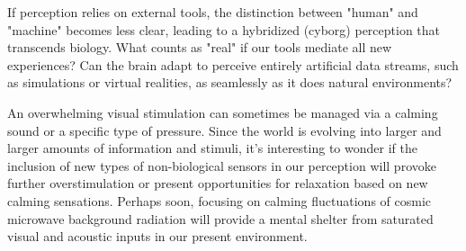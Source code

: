 If perception relies on external tools, the distinction between "human" and "machine" becomes less clear, leading to a hybridized (cyborg) perception that transcends biology. What counts as "real" if our tools mediate all new experiences? Can the brain adapt to perceive entirely artificial data streams, such as simulations or virtual realities, as seamlessly as it does natural environments?

An overwhelming visual stimulation can sometimes be managed via a calming sound or a specific type of pressure. Since the world is evolving into larger and larger amounts of information and stimuli, it's interesting to wonder if the inclusion of new types of non-biological sensors in our perception will provoke further overstimulation or present opportunities for relaxation based on new calming sensations. Perhaps soon, focusing on calming fluctuations of cosmic microwave background radiation will provide a mental shelter from saturated visual and acoustic inputs in our present environment.
